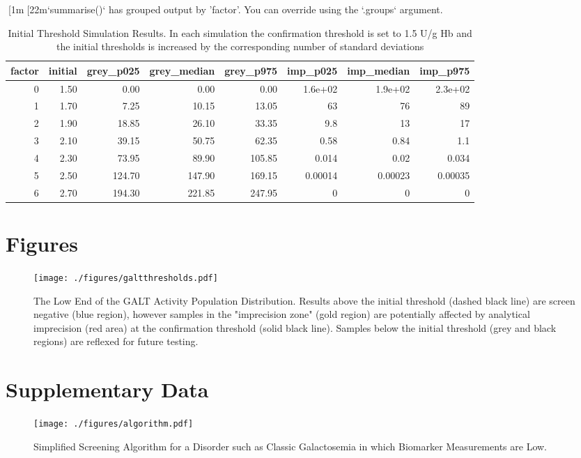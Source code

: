 \documentclass[review]{elsarticle}
\begin{document}
[1m[22m`summarise()` has grouped output by 'factor'. You can override using the `.groups` argument.
\begin{table}[ht]
\centering
\begin{tabular}{rrrrrrrr}
  \hline
factor & initial & grey\_p025 & grey\_median & grey\_p975 & imp\_p025 & imp\_median & imp\_p975 \\ 
  \hline
  0 & 1.50 & 0.00 & 0.00 & 0.00 & 1.6e+02 & 1.9e+02 & 2.3e+02 \\ 
    1 & 1.70 & 7.25 & 10.15 & 13.05 &  63 &  76 &  89 \\ 
    2 & 1.90 & 18.85 & 26.10 & 33.35 & 9.8 &  13 &  17 \\ 
    3 & 2.10 & 39.15 & 50.75 & 62.35 & 0.58 & 0.84 & 1.1 \\ 
    4 & 2.30 & 73.95 & 89.90 & 105.85 & 0.014 & 0.02 & 0.034 \\ 
    5 & 2.50 & 124.70 & 147.90 & 169.15 & 0.00014 & 0.00023 & 0.00035 \\ 
    6 & 2.70 & 194.30 & 221.85 & 247.95 &   0 &   0 &   0 \\ 
   \hline
\end{tabular}
\caption{Initial Threshold Simulation Results. In each simulation the confirmation threshold is set to 1.5 U/g Hb and the initial thresholds is increased by the corresponding number of standard deviations} 
\label{tab:imprecision}
\end{table}

\clearpage

\section*{Figures}
\label{sec:org0bf20b7}

\begin{figure}[htbp]
\centering
\texttt{[image: ./figures/galtthresholds.pdf]}
\caption{\label{fig:orgf17eb9e}The Low End of the GALT Activity Population Distribution. Results above the initial threshold (dashed black line) are screen negative (blue region), however samples in the "imprecision zone" (gold region) are potentially affected by analytical imprecision (red area) at the confirmation threshold (solid black line). Samples below the initial threshold (grey and black regions) are reflexed for future testing.}
\end{figure}

\clearpage

\section*{Supplementary Data}
\label{sec:org4426bb8}

\beginsupplement

\begin{figure}[htbp]
\centering
\texttt{[image: ./figures/algorithm.pdf]}
\caption{\label{fig:org890f84d}Simplified Screening Algorithm for a Disorder such as Classic Galactosemia in which Biomarker Measurements are Low.}
\end{figure}
\end{document}
